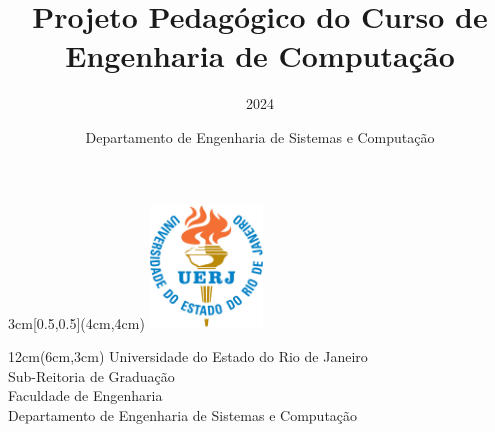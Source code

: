 \documentclass[envcountsame,envcountchap,openany]{svmono}
\begin{document}
\author {Departamento de Engenharia de Sistemas e Computação}

\begin{textblock*}{3cm}[0.5,0.5](4cm,4cm)
	\includegraphics[width=3cm]{imagens/logo_uerj_cor.jpg}
\end{textblock*}
\begin{textblock*}{12cm}(6cm,3cm)   %
	Universidade do Estado do Rio de Janeiro\\
	Sub-Reitoria de Graduação \\
	Faculdade de Engenharia\\
	Departamento de Engenharia de Sistemas e Computação
\end{textblock*}

\title{Projeto Pedagógico do Curso de Engenharia de Computação}
\subtitle{2024}
\date{} 
\maketitle
\pagestyle{empty}
\vfill

\tableofcontents
\listoftables

\frontmatter%

\mainmatter%
\pagestyle{fancy}










\backmatter%

\appendix
\appendixpage

\addappheadtotoc
\end{document}
